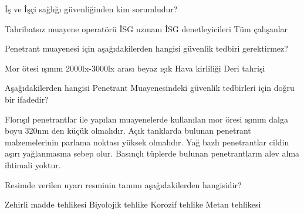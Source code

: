 \begin{question}[subtitle=]
	İş ve İşçi sağlığı güvenliğinden kim sorumludur?
	\begin{tasks}
          \task Tahribatsız muayene operatörü
          \task İSG uzmanı
          \task İSG denetleyicileri
          \task Tüm çalışanlar \correct
	\end{tasks}
\end{question}
\begin{solution}
	\correct
\end{solution}

\begin{question}[subtitle=]
  Penetrant muayenesi için aşağıdakilerden hangisi güvenlik tedbiri gerektirmez?
	\begin{tasks}
          \task Mor ötesi ışınım
          \task 2000lx-3000lx arası beyaz ışık \correct
          \task Hava kirliliği
          \task Deri tahrişi
	\end{tasks}
\end{question}
\begin{solution}
	\correct
\end{solution}


\begin{question}[subtitle=]
  Aşağıdakilerden hangisi Penetrant Muayenesindeki güvenlik tedbirleri için doğru bir ifadedir?
	\begin{tasks}
          \task Florışıl penetrantlar ile yapılan muayenelerde kullanılan mor öresi ışınım dalga boyu 320nm den küçük olmalıdır.
          \task Açık tanklarda bulunan penetrant malzemelerinin parlama noktası yüksek olmalıdır. \correct
          \task Yağ bazlı penetrantlar cildin aşırı yağlanmasına sebep olur.
          \task Basınçlı tüplerde bulunan penetrantların alev alma ihtimali yoktur.
	\end{tasks}
\end{question}
\begin{solution}
	\correct
\end{solution}


\begin{question}[subtitle=]
  	\begin{figure}[!htb]
		\centering
		\fbox{\texttt{[image: ww4]}}
	\end{figure}

  Resimde verilen uyarı resminin tanımı aşağıdakilerden hangisidir?
	\begin{tasks}
          \task Zehirli madde tehlikesi
          \task Biyolojik tehlike
          \task Korozif tehlike \correct
          \task Metan tehlikesi
	\end{tasks}
\end{question}
\begin{solution}
	\correct
\end{solution}

